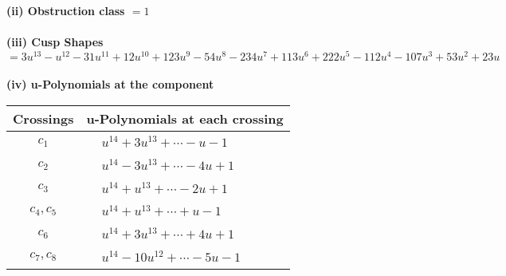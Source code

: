 \documentclass[1p]{elsarticle_modified}
\theoremstyle{definition}
\begin{document}
\flushleft \textbf{(ii) Obstruction class $= 1$}\\~\\
\flushleft \textbf{(iii) Cusp Shapes $= 3 u^{13}- u^{12}-31 u^{11}+12 u^{10}+123 u^9-54 u^8-234 u^7+113 u^6+222 u^5-112 u^4-107 u^3+53 u^2+23 u$}\\~\\
\newpage\renewcommand{\arraystretch}{1}
\flushleft \textbf{(iv) u-Polynomials at the component}\newline \\
\begin{tabular}{m{50pt}|m{274pt}}
Crossings & \hspace{64pt}u-Polynomials at each crossing \\
\hline $$\begin{aligned}c_{1}\end{aligned}$$&$\begin{aligned}
&u^{14}+3 u^{13}+\cdots- u-1
\end{aligned}$\\
\hline $$\begin{aligned}c_{2}\end{aligned}$$&$\begin{aligned}
&u^{14}-3 u^{13}+\cdots-4 u+1
\end{aligned}$\\
\hline $$\begin{aligned}c_{3}\end{aligned}$$&$\begin{aligned}
&u^{14}+u^{13}+\cdots-2 u+1
\end{aligned}$\\
\hline $$\begin{aligned}c_{4},c_{5}\end{aligned}$$&$\begin{aligned}
&u^{14}+u^{13}+\cdots+u-1
\end{aligned}$\\
\hline $$\begin{aligned}c_{6}\end{aligned}$$&$\begin{aligned}
&u^{14}+3 u^{13}+\cdots+4 u+1
\end{aligned}$\\
\hline $$\begin{aligned}c_{7},c_{8}\end{aligned}$$&$\begin{aligned}
&u^{14}-10 u^{12}+\cdots-5 u-1
\end{aligned}$\\

\end{tabular}
\end{document}
